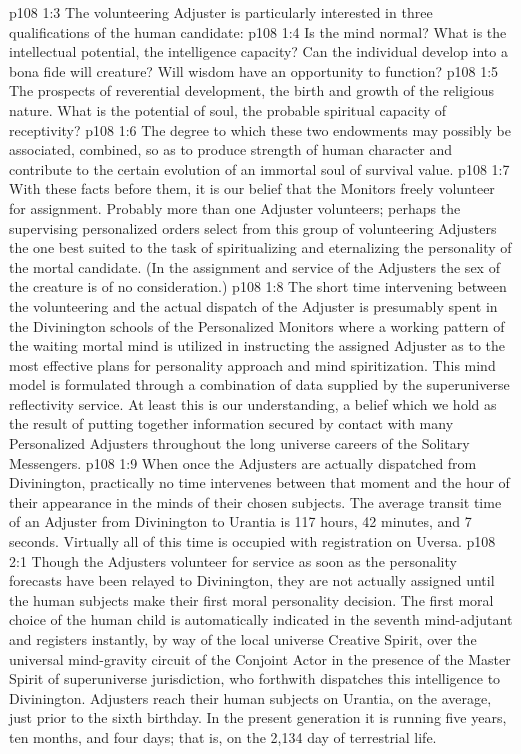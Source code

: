 \vs p108 1:3 The volunteering Adjuster is particularly interested in three qualifications of the human candidate:
\pc \vs p108 1:4 \bibnobreakspace {} Is the mind normal? What is the intellectual potential, the intelligence capacity? Can the individual develop into a bona fide will creature? Will wisdom have an opportunity to function?
\pc \vs p108 1:5 \bibnobreakspace {} The prospects of reverential development, the birth and growth of the religious nature. What is the potential of soul, the probable spiritual capacity of receptivity?
\pc \vs p108 1:6 \bibnobreakspace {} The degree to which these two endowments may possibly be associated, combined, so as to produce strength of human character and contribute to the certain evolution of an immortal soul of survival value.
\pc \vs p108 1:7 With these facts before them, it is our belief that the Monitors freely volunteer for assignment. Probably more than one Adjuster volunteers; perhaps the supervising personalized orders select from this group of volunteering Adjusters the one best suited to the task of spiritualizing and eternalizing the personality of the mortal candidate. (In the assignment and service of the Adjusters the sex of the creature is of no consideration.)\plusone
\vs p108 1:8 The short time intervening between the volunteering and the actual dispatch of the Adjuster is presumably spent in the Divinington schools of the Personalized Monitors where a working pattern of the waiting mortal mind is utilized in instructing the assigned Adjuster as to the most effective plans for personality approach and mind spiritization. This mind model is formulated through a combination of data supplied by the superuniverse reflectivity service. At least this is our understanding, a belief which we hold as the result of putting together information secured by contact with many Personalized Adjusters throughout the long universe careers of the Solitary Messengers.
\vs p108 1:9 When once the Adjusters are actually dispatched from Divinington, practically no time intervenes between that moment and the hour of their appearance in the minds of their chosen subjects. The average transit time of an Adjuster from Divinington to Urantia is 117 hours, 42 minutes, and 7 seconds. Virtually all of this time is occupied with registration on Uversa.
\vs p108 2:1 Though the Adjusters volunteer for service as soon as the personality forecasts have been relayed to Divinington, they are not actually assigned until the human subjects make their first moral personality decision. The first moral choice of the human child is automatically indicated in the seventh mind\hyp{}adjutant and registers instantly, by way of the local universe Creative Spirit, over the universal mind\hyp{}gravity circuit of the Conjoint Actor in the presence of the Master Spirit of superuniverse jurisdiction, who forthwith dispatches this intelligence to Divinington. Adjusters reach their human subjects on Urantia, on the average, just prior to the sixth birthday. In the present generation it is running five years, ten months, and four days; that is, on the 2,134 day of terrestrial life.

